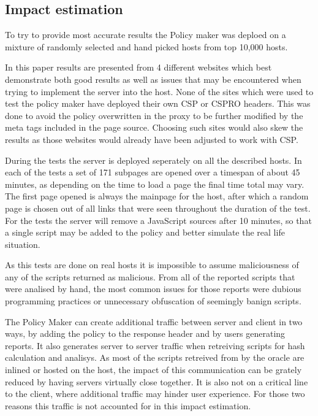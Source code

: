 \begin{description}
\subsection{Impact estimation}

To try to provide most accurate results the Policy maker was deploed on a mixture of randomly selected and hand picked hosts from top 10,000 hosts.

In this paper results are presented from 4 different websites which best demonstrate both good results as well as issues that may be encountered when trying to implement the server into the host.
None of the sites which were used to test the policy maker have deployed their own CSP or CSPRO headers.
This was done to avoid the policy overwritten in the proxy to be further modified by the meta tags included in the page source.
Choosing such sites would also skew the results as those websites would already have been adjusted to work with CSP.

During the tests the server is deployed seperately on all the described hosts.
In each of the tests a set of 171 subpages are opened over a timespan of about 45 minutes, as depending on the time to load a page the final time total may vary. 
The first page opened is always the mainpage for the host, after which a random page is chosen out of all links that were seen throughout the duration of the test.
For the tests the server will remove a JavaScript sources after 10 minutes, so that a single script may be added to the policy and better simulate the real life situation.

As this tests are done on real hosts it is impossible to assume maliciousness of any of the scripts returned as malicious.
From all of the reported scripts that were analised by hand, the most common issues for those reports were dubious programming practices or unnecessary obfuscation of seemingly banign scripts.

The Policy Maker can create additional traffic between server and client in two ways, by adding the policy to the response header and by users generating reports.
It also generates server to server traffic when retreiving scripts for hash calculation and analisys.
As most of the scripts retreived from by the oracle are inlined or hosted on the host, the impact of this communication can be grately reduced by having servers virtually close together.
It is also not on a critical line to the client, where additional traffic may hinder user experience.
For those two reasons this traffic is not accounted for in this impact estimation.


\end{description}
